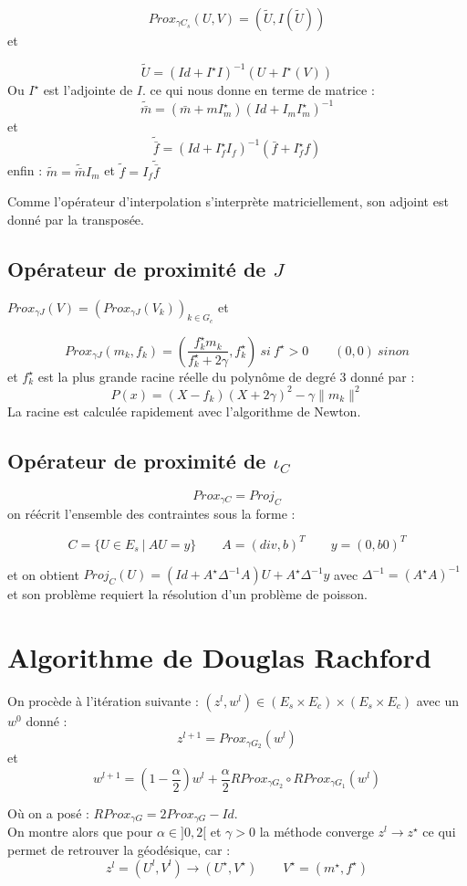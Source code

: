 \documentclass[a4paper,12pt]{article}
\begin{document}
$$
Prox_{\gamma C_s} (U,V)  = (\tilde{U},I(\tilde{U}))
$$
et 

$$
\tilde{U} = (Id +I^{\star}I)^{-1}(U+I^{\star}(V))
$$
Ou $I^{\star}$ est l'adjointe de $I$. ce qui nous donne en terme de matrice : 
$$
\tilde{\bar{m}} = (\bar{m}+mI_m^{\star})(Id +I_mI_m^{\star})^{-1}
$$
et 
$$
\tilde{\bar{f}} = (Id +I_f^{\star}I_f)^{-1}(\bar{f}+I_f^{\star}f)
$$
enfin : $\tilde{m}=\tilde{\bar{m}}I_m$ et $\tilde{f}=I_f\tilde{\bar{f}}$

Comme l'opérateur d'interpolation s'interprète matriciellement, son adjoint est donné par la transposée. 

\subsection{Opérateur de proximité de $J$}

$Prox_{\gamma J}(V)=(Prox_{\gamma J}(V_k))_{k\in G_c}$ et 

$$
Prox_{\gamma J}(m_k,f_k) = (\frac{f^{\star}_km_k}{f^{\star}_k+2\gamma},f^{\star}_k)\ si\ f^{\star}>0 \qquad (0,0)\ sinon
$$ 
et $f^{\star}_k$ est la plus grande racine réelle du polynôme de degré 3 donné par : 
$$
P(x) = (X-f_k)(X+2\gamma)^2-\gamma \|m_k\|^2
$$
La racine est calculée rapidement avec l’algorithme de Newton. 

\subsection{Opérateur de proximité de $\iota_C$}

$$
Prox_{\gamma C} = Proj_C
$$
on réécrit l'ensemble des contraintes sous la forme : 

$$
C=\{U\in E_s\ | \ AU=y\} \qquad A=(div,b)^T \qquad y = (0,b0)^T
$$

et on obtient $Proj_C(U)=(Id +A^{\star}\Delta^{-1}A)U + A^{\star} \Delta^{-1}y$ avec $\Delta^{-1}=(A^{\star}A)^{-1}$ et son problème requiert la résolution d'un problème de poisson. 

\section{Algorithme de Douglas Rachford}
On procède à l'itération suivante : $(z^l,w^l)\in (E_s\times E_c)\times (E_s\times E_c)$ avec un $w^0$ donné : 
$$
z^{l+1}=Prox_{\gamma G_2} (w^l)
$$
et 
$$
w^{l+1}=(1-\frac{\alpha}{2})w^l + \frac{\alpha}{2}RProx_{\gamma G_2}\circ RProx_{\gamma G_1} (w^l)
$$

Où on a posé : $RProx_{\gamma G} = 2Prox_{\gamma G}-Id$.\\
On montre alors que pour $\alpha\in ]0,2[$ et $\gamma>0$ la méthode converge $z^l\rightarrow z^{\star}$ ce qui permet de retrouver la géodésique, car : 
$$
z^l=(U^l,V^l)\rightarrow (U^{\star},V^{\star}) \qquad V^{\star}=(m^{\star},f^{\star})
$$
\end{document}
